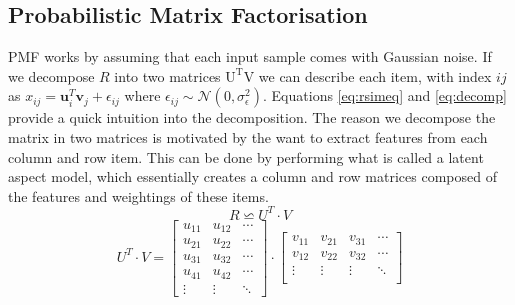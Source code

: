 \subsection{Probabilistic Matrix Factorisation}
\label{sec:pmf}
PMF works by assuming that each input sample comes with Gaussian noise. If we decompose $R$ into two matrices $\mathrm{U^{T} V}$ we can describe each item, with index $ij$ as $x_{ij}=\mathbf{u}_{i}^{T}\mathbf{v}_{j}+\epsilon_{ij}$ where $\epsilon_{ij} \sim  \mathcal{N} (0,\sigma^2_\epsilon)$. Equations \ref{eq:rsimeq} and \ref{eq:decomp} provide a quick intuition into the decomposition. The reason we decompose the matrix in two matrices is motivated by the want to extract features from each column and row item. This can be done by performing what is called a latent aspect model, which essentially creates a column and row matrices composed of the features and weightings of these items.
\begin{equation} \label{eq:rsimeq}
R \backsimeq U^{T} \cdot V
\end{equation}
\begin{equation}
 \label{eq:decomp}
U^{T} \cdot V=\begin{bmatrix}
u_{11} & u_{12} & \cdots \\
u_{21} & u_{22}& \cdots \\
u_{31}  & u_{32} & \cdots \\
u_{41}  & u_{42} & \cdots \\
\vdots  & \vdots & \ddots
\end{bmatrix} \cdot \begin{bmatrix}
v_{11} & v_{21} & v_{31} &  \cdots \\[-0.1em] 
v_{12} & v_{22} & v_{32} & \cdots \\[-0.1em]
\vdots & \vdots & \vdots &  \ddots \\[-0.1em]
\end{bmatrix}
\end{equation}

